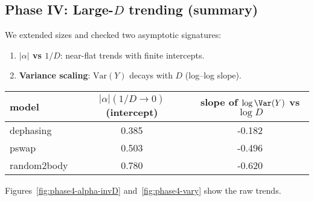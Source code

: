 \subsection*{Phase IV: Large-$D$ trending (summary)}
We extended sizes and checked two asymptotic signatures:
\begin{enumerate}
\item \textbf{$|\alpha|$ vs $1/D$}: near-flat trends with finite intercepts.
\item \textbf{Variance scaling}: $\mathrm{Var}(Y)$ decays with $D$ (log--log slope).
\end{enumerate}

\begin{center}
\begin{tabular}{lcc}
\hline
model & $|\alpha|(1/D\!\to\!0)$ (intercept) & slope of $\log\Var(Y)$ vs $\log D$ \\
\hline
dephasing & 0.385 & -0.182 \\
pswap & 0.503 & -0.496 \\
random2body & 0.780 & -0.620 \\
\hline
\end{tabular}
\end{center}

Figures~\ref{fig:phase4-alpha-invD} and~\ref{fig:phase4-vary} show the raw trends.